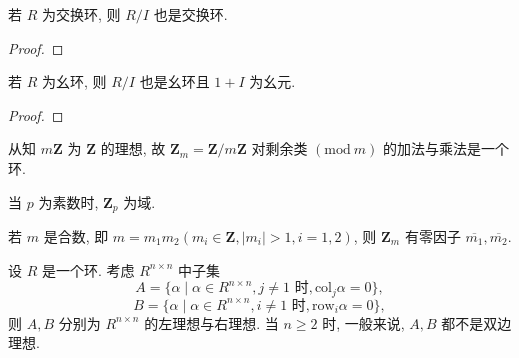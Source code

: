 \documentclass[../../main.tex]{subfiles}
\begin{document}
\begin{corollary}\label{corollary:抽象代数-推论 1.4.1}
若 \( R \) 为交换环, 则 \( R/I \) 也是交换环.
\end{corollary}
\begin{proof}

\end{proof}

\begin{corollary}\label{corollary:抽象代数-推论 1.4.2}
若 \( R \) 为幺环, 则 \( R/I \) 也是幺环且 \( 1 + I \) 为幺元.
\end{corollary}
\begin{proof}

\end{proof}

\begin{example}
从知 \( m\mathbf{Z} \) 为 \( \mathbf{Z} \) 的理想, 故 \( \mathbf{Z}_m = \mathbf{Z}/m\mathbf{Z} \) 对剩余类 \( (\text{mod}\ m) \) 的加法与乘法是一个环.

当 \( p \) 为素数时, \( \mathbf{Z}_p \) 为域.

若 \( m \) 是合数, 即 \( m = m_1m_2 (m_i \in \mathbf{Z}, |m_i| > 1, i = 1,2) \), 则 \( \mathbf{Z}_m \) 有零因子 \( \overline{m_1}, \overline{m_2} \).
\end{example}

\begin{example}
设 \( R \) 是一个环. 考虑 \( R^{n \times n} \) 中子集
\[
A = \{\alpha \mid \alpha \in R^{n \times n}, j \neq 1 \text{ 时}, \text{col}_j\alpha = 0\},
\]
\[
B = \{\alpha \mid \alpha \in R^{n \times n}, i \neq 1 \text{ 时}, \text{row}_i\alpha = 0\},
\]
则 \( A, B \) 分别为 \( R^{n \times n} \) 的左理想与右理想. 当 \( n \geqslant 2 \) 时, 一般来说, \( A, B \) 都不是双边理想.
\end{example}
\end{document}
